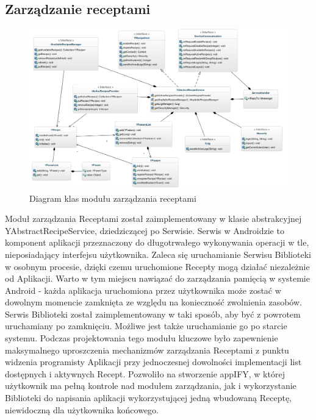 \documentclass[11pt,a4paper,polish,thesis]{dcsbook}
\begin{document}
\subsection{Zarządzanie receptami}
\begin{figure}[H]
  \centering
  \hspace*{-0.9in}
  \includegraphics[scale=0.6]{./resources/service_uml.png}
  \caption{Diagram klas modułu zarządzania receptami}
  \label{fig:service_uml}
\end{figure}
Moduł zarządzania Receptami został zaimplementowany w klasie abstrakcyjnej YAbstractRecipeService, dziedziczącej po Serwisie.
Serwis w Androidzie to komponent aplikacji przeznaczony do długotrwałego wykonywania operacji w tle, nieposiadający interfejsu użytkownika. \cite{android.serwis}
Zaleca się uruchamianie Serwisu Biblioteki w osobnym procesie, dzięki czemu uruchomione Recepty mogą działać niezależnie od Aplikacji. Warto w tym miejscu nawiązać do zarządzania pamięcią w systemie Android - każda aplikacja uruchomiona przez użytkownika może zostać w dowolnym momencie zamknięta ze względu na konieczność zwolnienia zasobów. Serwis Biblioteki został zaimplementowany w taki sposób, aby być z powrotem uruchamiany po zamknięciu. Możliwe jest także uruchamianie go po starcie systemu.
Podczas projektowania tego modułu kluczowe było zapewnienie maksymalnego uproszczenia mechanizmów zarządzania Receptami z punktu widzenia programisty Aplikacji przy jednoczesnej dowolności implementacji list dostępnych i aktywnych Recept. Pozwoliło na stworzenie appIFY, w której użytkownik ma pełną kontrole nad modułem zarządzania, jak i wykorzystanie Biblioteki do napisania aplikacji wykorzystującej jedną wbudowaną Receptę, niewidoczną dla użytkownika końcowego.
\end{document}
